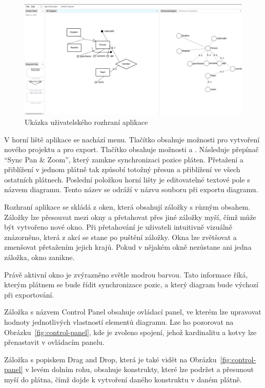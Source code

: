 \begin{figure}[!htb]
  \centering
  \includegraphics[width=\maxwidth{\textwidth}]{../img/app/user-interface.png}
  \caption{Ukázka uživatelského rozhraní aplikace}
  \label{fig:user-interface}
\end{figure}

V horní liště aplikace se nachází menu.
Tlačítko  obsahuje možnosti pro vytvoření nového projektu a pro export.
Tlačítko  obsahuje možnosti  a .
Následuje přepínač \enquote{Sync Pan \& Zoom}, který zamkne synchronizaci pozice pláten.
Přetažení a přiblížení v jednom plátně tak způsobí totožný přesun a přiblížení ve všech ostatních plátnech.
Poslední položkou horní lišty je editovatelné textové pole s názvem diagramu.
Tento název se odráží v názvu souboru při exportu diagramu.

Rozhraní aplikace se skládá z oken, která obsahují záložky s různým obsahem.
Záložky lze přesouvat mezi okny a přetahovat přes jiné záložky myší, čímž může být vytvořeno nové okno.
Při přetahování je uživateli intuitivně vizuálně znázorněno, která z akcí se stane po puštění záložky.
Okna lze zvětšovat a zmenšovat přetažením jejich krajů.
Pokud v nějakém okně nezůstane ani jedna záložka, okno zanikne.

Právě aktivní okno je zvýrazněno světle modrou barvou.
Tato informace říká, kterým plátnem se bude řídit synchronizace pozic, a který diagram bude výchozí při exportování.

Záložka s názvem Control Panel obsahuje ovládací panel, ve kterém lze upravovat hodnoty jednotlivých vlastností elementů diagramu.
Lze ho pozorovat na Obrázku~\ref{fig:control-panel}, kde je zvoleno spojení, jehož kardinalitu a kotvy lze přenastavit v ovládacím panelu.

Záložka s popiskem Drag and Drop, která je také vidět na Obrázku~\ref{fig:control-panel} v levém dolním rohu, obsahuje konstrukty, které lze podržet a přesunout myší do plátna, čímž dojde k vytvoření daného konstruktu v daném plátně.

